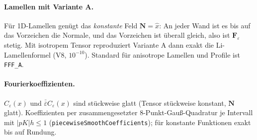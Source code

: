 \paragraph{Lamellen mit Variante A.} Für 1D-Lamellen genügt das \emph{konstante} Feld $\mathbf N=\hat x$:
An jeder Wand ist es bis auf das Vorzeichen die Normale, und das Vorzeichen ist überall gleich, also ist
$\mathbf F_\varepsilon$ stetig. Mit isotropem Tensor reproduziert Variante A dann exakt die Li-Lamellenformel
(V8, $10^{-10}$). Standard für anisotrope Lamellen und Profile ist \verb|FFF_A|.
\paragraph{Fourierkoeffizienten.} $C_\varepsilon(x)$ und $\overline{\overline\varepsilon}C_\varepsilon(x)$ sind stückweise glatt
(Tensor stückweise konstant, $\mathbf N$ glatt). Koeffizienten per zusammengesetzter 8-Punkt-Gauß-Quadratur je
Intervall mit $|pK|h\le1$ (\verb|piecewiseSmoothCoefficients|); für konstante Funktionen exakt bis auf Rundung.

